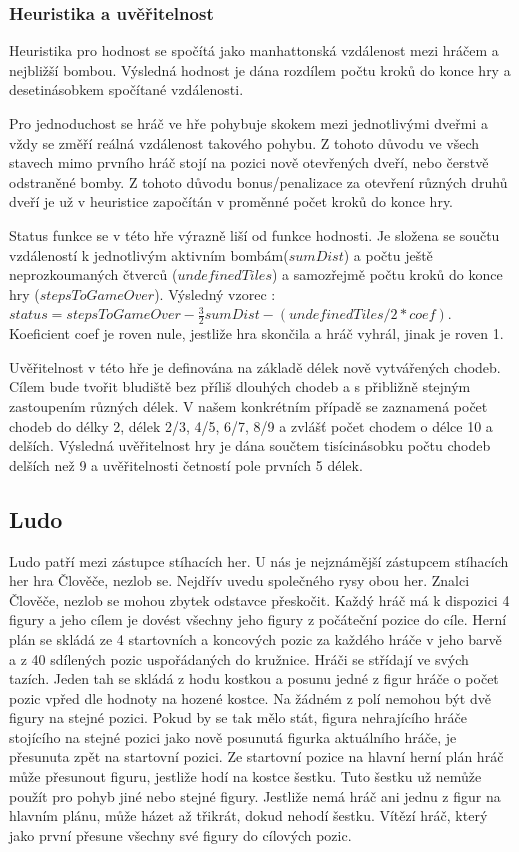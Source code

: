 \subsubsection{Heuristika a uvěřitelnost}

Heuristika pro hodnost se spočítá jako manhattonská vzdálenost mezi hráčem a nejbližší bombou. Výsledná hodnost je dána rozdílem počtu kroků do konce hry a desetinásobkem spočítané vzdálenosti.

Pro jednoduchost se hráč ve hře pohybuje skokem mezi jednotlivými dveřmi a vždy se změří reálná vzdálenost takového pohybu. Z tohoto důvodu ve všech stavech mimo prvního hráč stojí na pozici nově otevřených dveří, nebo čerstvě odstraněné bomby. Z tohoto důvodu bonus/penalizace za otevření různých druhů dveří je už v heuristice započítán v proměnné počet kroků do konce hry.

Status funkce se v této hře výrazně liší od funkce hodnosti. Je složena se součtu vzdáleností k jednotlivým aktivním bombám($sumDist$) a počtu ještě neprozkoumaných čtverců ($undefinedTiles$) a samozřejmě počtu kroků do konce hry ($stepsToGameOver$). Výsledný vzorec : $status = stepsToGameOver - \frac{3}{2}sumDist-(undefinedTiles / 2 * coef)$. Koeficient coef je roven nule, jestliže hra skončila a hráč vyhrál, jinak je roven 1. 

Uvěřitelnost v této hře je definována na základě délek nově vytvářených chodeb. Cílem bude tvořit bludiště bez příliš dlouhých chodeb a s přibližně stejným zastoupením různých délek. V našem konkrétním případě se zaznamená počet chodeb do délky 2, délek 2/3, 4/5, 6/7, 8/9 a zvlášť počet chodem o délce 10 a delších. Výsledná uvěřitelnost hry je dána součtem tisícinásobku počtu chodeb delších než 9 a uvěřitelnosti četností pole prvních 5 délek.

\subsection{Ludo}

Ludo patří mezi zástupce stíhacích her. U nás je nejznámější zástupcem stíhacích her hra Člověče, nezlob se. Nejdřív uvedu společného rysy obou her. Znalci Člověče, nezlob se mohou zbytek odstavce přeskočit. Každý hráč má k dispozici 4 figury a jeho cílem je dovést všechny jeho figury z počáteční pozice do cíle. Herní plán se skládá ze 4 startovních a koncových pozic za každého hráče v jeho barvě a z 40 sdílených pozic uspořádaných do kružnice. Hráči se střídají ve svých tazích. Jeden tah se skládá z hodu kostkou a posunu jedné z figur hráče o počet pozic vpřed dle hodnoty na hozené kostce. Na žádném z polí nemohou být dvě figury na stejné pozici. Pokud by se tak mělo stát, figura nehrajícího hráče stojícího na stejné pozici jako nově posunutá figurka aktuálního hráče, je přesunuta zpět na startovní pozici. Ze startovní pozice na hlavní herní plán hráč může přesunout figuru, jestliže hodí na kostce šestku. Tuto šestku už nemůže použít pro pohyb jiné nebo stejné figury. Jestliže nemá hráč ani jednu z figur na hlavním plánu, může házet až třikrát, dokud nehodí šestku. Vítězí hráč, který jako první přesune všechny své figury do cílových pozic.

